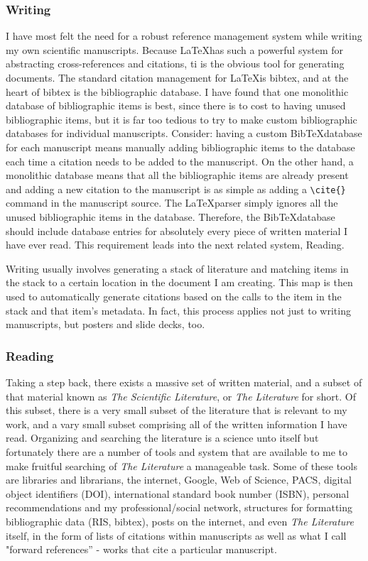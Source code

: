 \documentclass[letterpaper,12pt]{article}
\begin{document}
\subsubsection{Writing}
I have most felt the need for a robust reference management system while writing my own scientific manuscripts. Because \LaTeX has such a powerful system for abstracting cross-references and citations, ti is the obvious tool for generating documents. The standard citation management for \LaTeX is bibtex, and at the heart of bibtex is the bibliographic database. I have found that one monolithic database of bibliographic items is best, since there is to cost to having unused bibliographic items, but it is far too tedious to try to make custom bibliographic databases for individual manuscripts. Consider: having a custom Bib\TeX database for each manuscript means manually adding bibliographic items to the database each time a citation needs to be added to the manuscript. On the other hand, a monolithic database means that all the bibliographic items are already present and adding a new citation to the manuscript is as simple as adding a \verb|\cite{}| command in the manuscript source. The \LaTeX parser simply ignores all the unused bibliographic items in the database. Therefore, the Bib\TeX database should include database entries for absolutely every piece of written material I have ever read. This requirement leads into the next related system, Reading.

Writing usually involves generating a stack of literature and matching items in the stack to a certain location in the document I am creating. This map is then used to automatically generate citations based on the calls to the item in the stack and that item's metadata. In fact, this process applies not just to writing manuscripts, but posters and slide decks, too.


\subsubsection{Reading}
Taking a step back, there exists a massive set of written material, and a subset of that material known as \emph{The Scientific Literature}, or \emph{The Literature} for short. Of this subset, there is a very small subset of the literature that is relevant to my work, and a vary small subset comprising all of the written information I have read. Organizing and searching the literature is a science unto itself but fortunately there are a number of tools and system that are available to me to make fruitful searching of \emph{The Literature} a manageable task. Some of these tools are libraries and librarians, the internet, Google, Web of Science, PACS, digital object identifiers (DOI), international standard book number (ISBN), personal recommendations and my professional/social network, structures for formatting bibliographic data (RIS, bibtex), posts on the internet, and even \emph{The Literature} itself, in the form of lists of citations within manuscripts as well as what I call "forward references'' - works that cite a particular manuscript.
\end{document}
